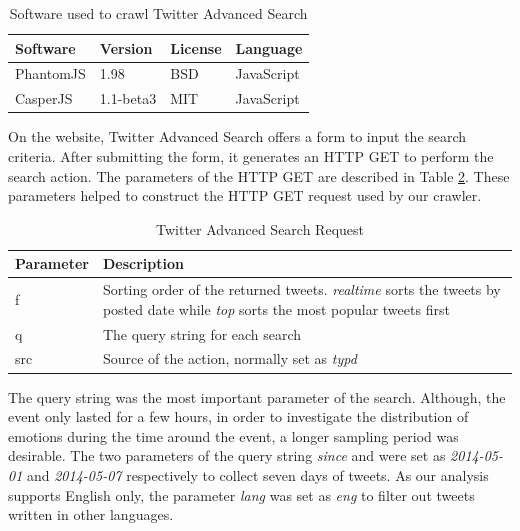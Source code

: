 \begin{table}[!h]
\caption{Software used to crawl Twitter Advanced Search}
\label{table:crawlerSoftware}
\centering
\begin{tabular}{|l|l|l|l|}

\hline
\textbf{Software} & \textbf{Version} & \textbf{License} & \textbf{Language} \\ \hline \hline
PhantomJS & 1.98 & BSD & JavaScript \\ \hline
CasperJS & 1.1-beta3 & MIT & JavaScript \\ \hline

\end{tabular}
\end{table}

On the website, Twitter Advanced Search offers a form to input the search criteria. After submitting the form, it generates an HTTP GET to perform the search action. The parameters of the HTTP GET are described in Table \ref{table:crawlerRequest}. These parameters helped to construct the HTTP GET request used by our crawler.

\begin{table}[!h]
\caption{Twitter Advanced Search Request}
\label{table:crawlerRequest}
\centering
\begin{tabular}{|p{2cm}|p{10cm}|}

\hline
\textbf{Parameter} & \textbf{Description} \\ \hline \hline
f & Sorting order of the returned tweets. \textit{realtime} sorts the tweets by posted date while \textit{top} sorts the most popular tweets first \\ \hline
q & The query string for each search \\ \hline
src & Source of the action, normally set as \textit{typd} \\ \hline
\end{tabular}
\end{table}

The query string was the most important parameter of the search. Although, the event only lasted for a few hours, in order to investigate the distribution of emotions during the time around the event, a longer sampling period was desirable. The two parameters of the query string \textit{since} and  were set as \textit{2014-05-01} and \textit{2014-05-07} respectively to collect seven days of tweets. As our analysis supports English only, the parameter \textit{lang} was set as \textit{eng} to filter out tweets written in other languages. 

